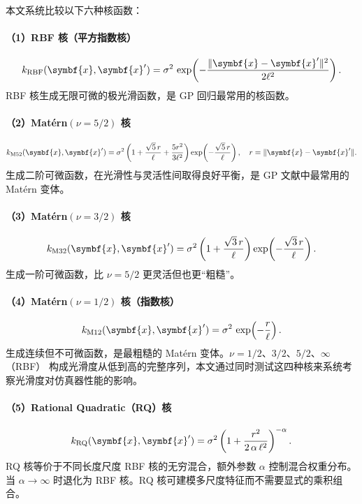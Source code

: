 本文系统比较以下六种核函数：

\paragraph{（1）RBF 核（平方指数核）}
\begin{equation}\label{eq:k-rbf}
  k_{\rm RBF}(\symbf{x},\symbf{x}') = \sigma^2\, \exp\!\left(
    -\frac{\lVert \symbf{x}-\symbf{x}' \rVert^2}{2\ell^{2}} \right).
\end{equation}
RBF 核生成无限可微的极光滑函数，是 GP 回归最常用的核函数。

\paragraph{（2）Mat\'ern$(\nu=5/2)$ 核}
\begin{equation}\label{eq:k-m52}
  k_{\rm M52}(\symbf{x},\symbf{x}') = \sigma^2 \left(
    1 + \frac{\sqrt{5}\,r}{\ell} + \frac{5 r^2}{3\ell^2}
  \right) \exp\!\left(-\frac{\sqrt{5}\,r}{\ell}\right),
  \quad r=\lVert \symbf{x}-\symbf{x}' \rVert.
\end{equation}
生成二阶可微函数，在光滑性与灵活性间取得良好平衡，是 GP 文献中最常用的 Mat\'ern
变体\cite{Rasmussen2006}。

\paragraph{（3）Mat\'ern$(\nu=3/2)$ 核}
\begin{equation}\label{eq:k-m32}
  k_{\rm M32}(\symbf{x},\symbf{x}') = \sigma^2 \left(1 + \frac{\sqrt{3}\,r}{\ell}\right)
    \exp\!\left(-\frac{\sqrt{3}\,r}{\ell}\right).
\end{equation}
生成一阶可微函数，比 $\nu=5/2$ 更灵活但也更``粗糙''。

\paragraph{（4）Mat\'ern$(\nu=1/2)$ 核（指数核）}
\begin{equation}\label{eq:k-m12}
  k_{\rm M12}(\symbf{x},\symbf{x}') = \sigma^2\, \exp\!\left(-\frac{r}{\ell}\right).
\end{equation}
生成连续但不可微函数，是最粗糙的 Mat\'ern 变体。$\nu=1/2$、$3/2$、$5/2$、$\infty$（RBF）
构成光滑度从低到高的完整序列，本文通过同时测试这四种核来系统考察光滑度对仿真器性能的影响。

\paragraph{（5）Rational Quadratic（RQ）核}
\begin{equation}\label{eq:k-rq}
  k_{\rm RQ}(\symbf{x},\symbf{x}') = \sigma^2 \left(
    1 + \frac{r^2}{2\,\alpha\,\ell^2}
  \right)^{-\alpha}.
\end{equation}
RQ 核等价于不同长度尺度 RBF 核的无穷混合，额外参数 $\alpha$ 控制混合权重分布。当
$\alpha\to\infty$ 时退化为 RBF 核。RQ 核可建模多尺度特征而不需要显式的乘积组合。

